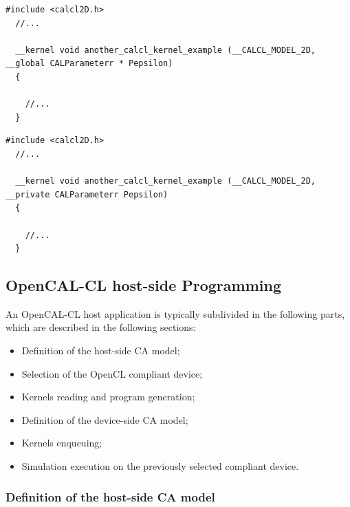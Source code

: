 \begin{lstlisting}[float,floatplacement=H, label=lst:Another-OpenCAL-CL-kernel, caption={Another example of OpenCAL-CL kernel, with an additional global parameter.}]
  #include <calcl2D.h>
  //...

  __kernel void another_calcl_kernel_example (__CALCL_MODEL_2D, __global CALParameterr * Pepsilon)
  {

    //...
  }
\end{lstlisting}

\begin{lstlisting}[float,floatplacement=H, label=lst:kernel-private-parameter, caption={Another example of OpenCAL-CL kernel, with an additional private parameter.}]
  #include <calcl2D.h>
  //...

  __kernel void another_calcl_kernel_example (__CALCL_MODEL_2D, __private CALParameterr Pepsilon)
  {

    //...
  }
\end{lstlisting}



\subsection{OpenCAL-CL host-side Programming}

An OpenCAL-CL host application is typically subdivided in the
following parts, which are described in the following sections:
\begin{itemize}
\item Definition of the host-side CA model;
\item Selection of the OpenCL compliant device;
\item Kernels reading and program generation;
\item Definition of the device-side CA model;
\item Kernels enqueuing;
\item Simulation execution on the previously selected compliant
  device.
\end{itemize}


\subsubsection{Definition of the host-side CA model}

